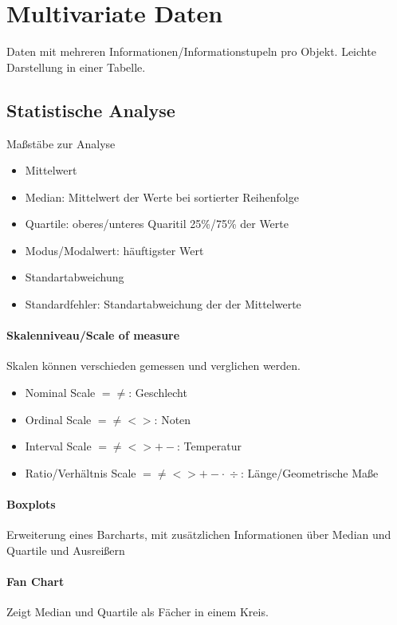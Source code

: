 \documentclass[ngerman]{scrartcl}
\begin{document}
\section{Multivariate Daten}
Daten mit mehreren Informationen/Informationstupeln pro Objekt. Leichte Darstellung in einer Tabelle.

\subsection{Statistische Analyse}
Maßstäbe zur Analyse
\begin{itemize}
  \item Mittelwert
  \item Median: Mittelwert der Werte bei sortierter Reihenfolge
  \item Quartile: oberes/unteres Quaritil 25\%/75\% der Werte
  \item Modus/Modalwert: häuftigster Wert
  \item Standartabweichung
  \item Standardfehler: Standartabweichung der der Mittelwerte
\end{itemize}

\paragraph{Skalenniveau/Scale of measure} Skalen können verschieden gemessen und verglichen werden.

\begin{itemize}
  \item Nominal Scale $ = \neq $: Geschlecht
  \item Ordinal Scale $ = \neq < > $: Noten
  \item Interval Scale $ = \neq < > + - $: Temperatur
  \item Ratio/Verhältnis Scale $ = \neq < > + - \cdot\ \div $: Länge/Geometrische Maße
\end{itemize}

\paragraph{Boxplots} Erweiterung eines Barcharts, mit zusätzlichen Informationen über Median und Quartile und Ausreißern

\paragraph{Fan Chart} Zeigt Median und Quartile als Fächer in einem Kreis.
\end{document}
